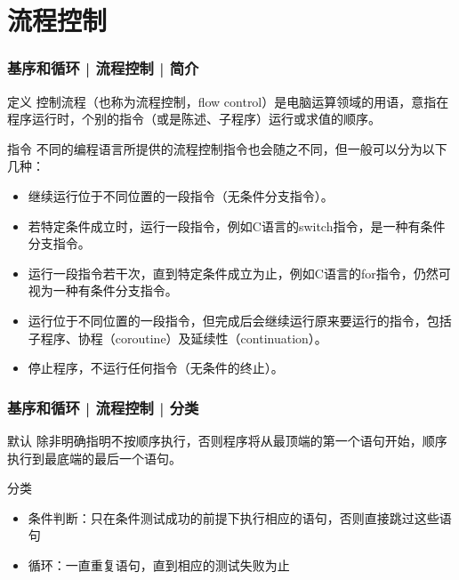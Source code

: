\section{流程控制}
\begin{frame}
  \frametitle{基序和循环 | 流程控制 | 简介}
  \begin{block}{定义}
    控制流程（也称为流程控制，flow control）是电脑运算领域的用语，意指在程序运行时，个别的指令（或是陈述、子程序）运行或求值的顺序。
  \end{block}
  \pause
  \vspace{-0.5em}
  \begin{block}{指令}
    不同的编程语言所提供的流程控制指令也会随之不同，但一般可以分为以下几种：
    \begin{itemize}
      \item 继续运行位于不同位置的一段指令（无条件分支指令）。
      \item 若特定条件成立时，运行一段指令，例如C语言的switch指令，是一种有条件分支指令。
      \item 运行一段指令若干次，直到特定条件成立为止，例如C语言的for指令，仍然可视为一种有条件分支指令。
      \item 运行位于不同位置的一段指令，但完成后会继续运行原来要运行的指令，包括子程序、协程（coroutine）及延续性（continuation）。
      \item 停止程序，不运行任何指令（无条件的终止）。
    \end{itemize}
  \end{block}
\end{frame}

\begin{frame}
  \frametitle{基序和循环 | 流程控制 | 分类}
  \begin{block}{默认}
    除非明确指明不按顺序执行，否则程序将从最顶端的第一个语句开始，顺序执行到最底端的最后一个语句。
  \end{block}
  \pause
  \begin{block}{\alert{分类}}
    \begin{itemize}
      \item 条件判断：只在条件测试成功的前提下执行相应的语句，否则直接跳过这些语句
      \item 循环：一直重复语句，直到相应的测试失败为止
    \end{itemize}
  \end{block}
\end{frame}

